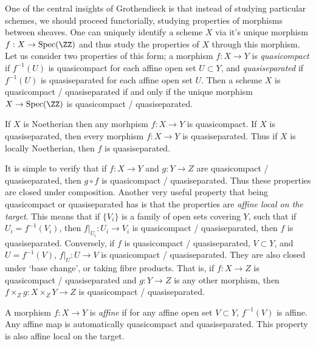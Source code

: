 One of the central insights of Grothendieck is that instead of studying particular schemes, we should proceed functorially, studying properties of morphisms between sheaves. One can uniquely identify a scheme $X$ via it's unique morphism $f: X \to \text{Spec}(\ZZ)$ and thus study the properties of $X$ through this morphism. Let us consider two properties of this form; a morphism $f: X \to Y$ is \emph{quasicompact} if $f^{-1}(U)$ is quasicompact for each affine open set $U \subset Y$, and \emph{quasiseparated} if $f^{-1}(U)$ is quasiseparated for each affine open set $U$. Then a scheme $X$ is quasicompact / quasiseparated if and only if the unique morphism $X \to \text{Spec}(\ZZ)$ is quasicompact / quasiseparated.

\begin{lemma}
    If $X$ is Noetherian then any morhpism $f: X \to Y$ is quasicompact. If $X$ is quasiseparated, then every morphism $f: X \to Y$ is quasiseparated. Thus if $X$ is locally Noetherian, then $f$ is quasiseparated.
\end{lemma}

It is simple to verify that if $f: X \to Y$ and $g: Y \to Z$ are quasicompact / quasiseparated, then $g \circ f$ is quasicompact / quasiseparated. Thus these properties are closed under composition. Another very useful property that being quasicompact or quasiseparated has is that the properties are \emph{affine local on the target}. This means that if $\{ V_i \}$ is a family of open sets covering $Y$, such that if $U_i = f^{-1}(V_i)$, then $f|_{U_i}: U_i \to V_i$ is quasicompact / quasiseparated, then $f$ is quasiseparated. Conversely, if $f$ is quasicompact / quasiseparated, $V \subset Y$, and $U = f^{-1}(V)$, $f|_U: U \to V$ is quasicompact / quasiseparated. They are also closed under `base change', or taking fibre products. That is, if $f: X \to Z$ is quasicompact / quasiseparated and $g: Y \to Z$ is any other morphism, then $f \times_Z g: X \times_Z Y \to Z$ is quasicompact / quasiseparated.

A morphism $f: X \to Y$ is \emph{affine} if for any affine open set $V \subset Y$, $f^{-1}(V)$ is affine. Any affine map is automatically quasicompact and quasiseparated. This property is also affine local on the target.

